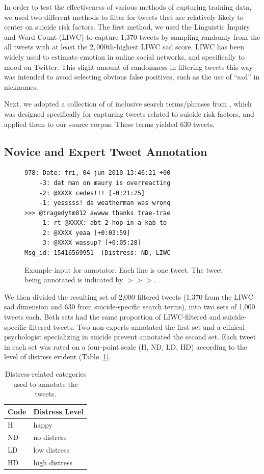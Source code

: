 \documentclass[11pt]{article}
\begin{document}
In order to test the effectiveness of various methods of capturing training data, we used two different methods to filter for tweets that are relatively likely to center on suicide risk factors. The first method, we used the Linguistic Inquiry and Word Count (LIWC) to capture 1,370 tweets by sampling randomly from the all tweets with at least the $2,000$th-highest LIWC sad score. LIWC has been widely used to estimate emotion in online social networks, and specifically to  mood on Twitter. This slight amount of randomness in filtering tweets this way was intended to avoid selecting obvious false positives, such as the use of ``sad'' in nicknames.

Next, we adopted a collection of of inclusive search terms/phrases from \cite{Jay}, which was designed specifically for capturing tweets related to suicide risk factors, and applied them to our source corpus. These terms yielded 630 tweets.


\subsection{Novice and Expert Tweet Annotation}
\begin{figure}[h]
  \centering
{\small
\begin{verbatim}
978: Date: fri, 04 jun 2010 13:46:21 +00 
    -3: dat man on maury is overreacting
    -2: @XXXX cedes!!! [-0:21:25]
    -1: yesssss! da weatherman was wronq
>>> @tragedytm812 awwww thanks trae-trae
     1: rt @XXXX: abt 2 hop in a kab to 
     2: @XXXX yeaa [+0:03:59]
     3: @XXXX wassup? [+0:05:28]
Msg_id: 15416569951  [Distress: ND, LIWC
\end{verbatim}}
  \caption{Example input for annotator. Each line is one tweet. The tweet being annotated is indicated by $>>>$.}
  \label{fig:annotateeg}
\end{figure}

We then divided the resulting set of 2,000 filtered tweets (1,370 from the LIWC sad dimension and 630 from suicide-specific search terms), into two sets of 1,000 tweets each. Both sets had the same proportion of LIWC-filtered and suicide-specific-filtered tweets. Two non-experts annotated the first set and a clinical psychologist specializing in suicide prevent annotated the second set. Each tweet in each set was rated on a four-point scale (H, ND, LD, HD) according to the level of distress evident (Table~\ref{tab:distress}).


\begin{table}[h]
  \centering
  \begin{tabular}[h]{ll}
   \textbf{Code}&\textbf{Distress Level}\\
\hline
 H & happy \\
ND & no distress\\
 LD & low distress\\
HD &high distress
  \end{tabular}
  \caption{Distress-related categories used to annotate the tweets.}
  \label{tab:distress}
\end{table}
\end{document}
